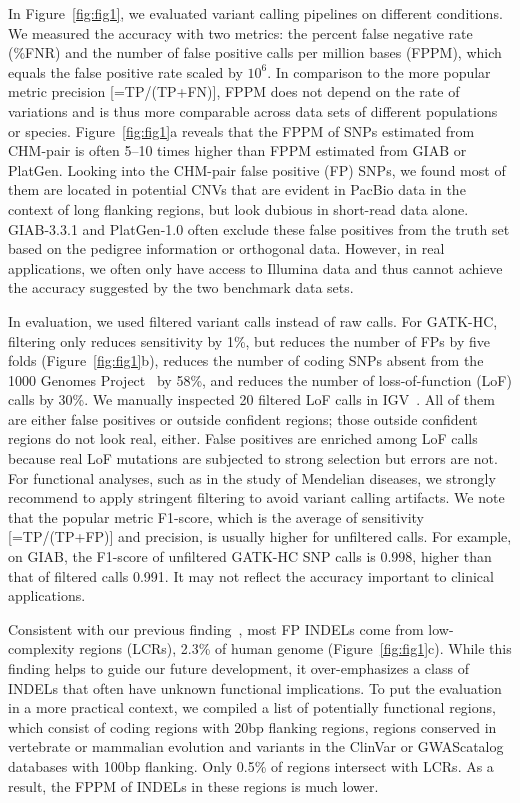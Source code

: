 \documentclass{bioinfo}
\begin{document}
In Figure~\ref{fig:fig1}, we evaluated variant calling pipelines on different
conditions. We measured the accuracy with two metrics: the percent false
negative rate (\%FNR) and the number of false positive calls per million bases
(FPPM), which equals the false positive rate scaled by $10^6$. In comparison to
the more popular metric precision [=TP/(TP+FN)], FPPM does not depend on the
rate of variations and is thus more comparable across data sets of different
populations or species. Figure~\ref{fig:fig1}a reveals that the FPPM of SNPs
estimated from CHM-pair is often 5--10 times higher than FPPM estimated from
GIAB or PlatGen.  Looking into the CHM-pair false positive (FP) SNPs, we found
most of them are located in potential CNVs that are evident in PacBio data in
the context of long flanking regions, but look dubious in short-read data
alone. GIAB-3.3.1 and PlatGen-1.0 often exclude these false positives from the truth set
based on the pedigree information or orthogonal data.  However, in real
applications, we often only have access to Illumina data and thus cannot
achieve the accuracy suggested by the two benchmark data sets.

In evaluation, we used filtered variant calls instead of raw calls. For
GATK-HC, filtering only reduces sensitivity by 1\%, but reduces the number of FPs by
five folds (Figure~\ref{fig:fig1}b), reduces the number of coding SNPs absent
from the 1000 Genomes Project~\citep{1000-Genomes-Project-Consortium:2015aa} by
58\%, and reduces the number of loss-of-function (LoF) calls by 30\%. We
manually inspected 20 filtered LoF calls in
IGV~\citep{Robinson:2011uo}. All of them are either false positives or outside
confident regions; those outside confident regions do not look real, either.
False positives are enriched among LoF calls because real LoF mutations are
subjected to strong selection but errors are not. For functional analyses, such
as in the study of Mendelian diseases, we strongly recommend to apply stringent
filtering to avoid variant calling artifacts. We note that the popular metric
F1-score, which is the average of sensitivity [=TP/(TP+FP)] and precision, is usually higher for unfiltered calls. For example, on GIAB,
the F1-score of unfiltered GATK-HC SNP calls is 0.998, higher than that of
filtered calls 0.991. It may not reflect the accuracy important to clinical
applications.

Consistent with our previous finding~\citep{Li:2014ac}, most FP INDELs come
from low-complexity regions (LCRs), 2.3\% of human genome
(Figure~\ref{fig:fig1}c). While this finding helps to guide our future
development, it over-emphasizes a class of INDELs that often have unknown
functional implications. To put the evaluation in a more practical context,
we compiled a list of potentially functional regions, which consist of coding
regions with 20bp flanking regions, regions conserved in vertebrate or
mammalian evolution and variants in the ClinVar or GWAScatalog databases with
100bp flanking. Only 0.5\% of regions intersect with LCRs. As a result, the
FPPM of INDELs in these regions is much lower.
\end{document}
